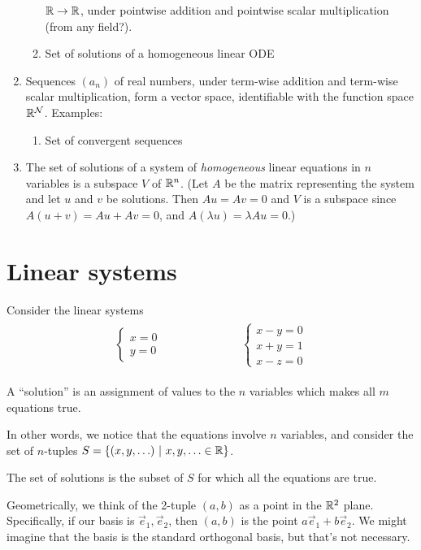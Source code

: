 \begin{enumerate}
\begin{enumerate}
    $\mathbb{R} \to \mathbb{R}$, under pointwise addition and pointwise scalar multiplication
    (from any field?).
  \item Set of solutions of a homogeneous linear ODE
  \end{enumerate}
\item Sequences $(a_n)$ of real numbers, under term-wise addition and term-wise
  scalar multiplication, form a vector space, identifiable with the function
  space $\mathbb{R}^{\mathcal{N}}$. Examples:
  \begin{enumerate}
  \item Set of convergent sequences
  \end{enumerate}
\item The set of solutions of a system of \textit{homogeneous} linear equations
  in $n$ variables is a subspace $V$ of $\mathbb{R}^n$. (Let $A$ be the matrix
  representing the system and let $u$ and $v$ be solutions. Then $Au = Av = 0$
  and $V$ is a subspace since $A(u + v) = Au + Av = 0$, and
  $A(\lambda u) = \lambda Au = 0$.)
\end{enumerate}

\section{Linear systems}

Consider the linear systems
\begin{align*}
  \begin{array}{cc}
    \begin{cases}
      x = 0\\
      y = 0
    \end{cases}
    ~~~~~~~~~~~~~~~~~~~~~~~~~~~~&
    \begin{cases}
      x - y = 0\\
      x + y = 1\\
      x - z = 0
    \end{cases}
  \end{array}
\end{align*}

A ``solution'' is an assignment of values to the $n$ variables which makes all
$m$ equations true.

In other words, we notice that the equations involve $n$ variables, and
consider the set of $n$-tuples
$S = \{(x, y, \ldots) ~|~ x, y, \ldots \in  \mathbb{R}\}$.

The set of solutions is the subset of $S$ for which all the equations are true.

Geometrically, we think of the 2-tuple $(a, b)$ as a point in the $\mathbb{R}^2$
plane. Specifically, if our basis is $\vec e_1, \vec e_2$, then $(a, b)$ is the
point $a\vec e_1 + b\vec e_2$. We might imagine that the basis is the standard
orthogonal basis, but that's not necessary.

